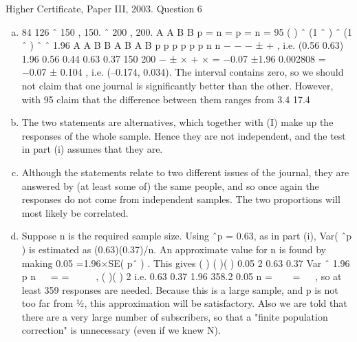 \documentclass[a4paper,12pt]{article}
\begin{document}
Higher Certificate, Paper III, 2003. Question 6
\begin{enumerate}[(a)]
\item  84 126
ˆ 150 , 150. ˆ 200 , 200. A A B B p = n = p = n =
95%
( ) ˆ (1 ˆ ) ˆ (1 ˆ )
ˆ ˆ 1.96 A A B B
A B
A B
p p p p
p p
n n
− −
− ± + ,
i.e. (0.56 0.63) 1.96 0.56 0.44 0.63 0.37
150 200
− ± × + ×
= −0.07 ±1.96 0.002808 = −0.07 ± 0.104 ,
i.e. (–0.174, 0.034).
The interval contains zero, so we should not claim that one journal is
significantly better than the other. However, with 95%
claim that the difference between them ranges from 3.4%
17.4%
\item The two statements are alternatives, which together with (I) make up the
responses of the whole sample. Hence they are not independent, and the test
in part (i) assumes that they are.
\item Although the statements relate to two different issues of the journal, they are
answered by (at least some of) the same people, and so once again the
responses do not come from independent samples. The two proportions will
most likely be correlated.
\item Suppose n is the required sample size. Using ˆp = 0.63, as in part (i), Var( ˆp )
is estimated as (0.63)(0.37)/n. An approximate value for n is found by making
0.05 =1.96×SE( pˆ ) . This gives
( ) ( )( ) 0.05 2 0.63 0.37 Var ˆ
1.96
p
n
  = =  
 
,
( )( )
2 i.e. 0.63 0.37 1.96 358.2
0.05
n =   =
 
,
so at least 359 responses are needed.
Because this is a large sample, and p is not too far from ½, this approximation
will be satisfactory. Also we are told that there are a very large number of
subscribers, so that a "finite population correction" is unnecessary (even if we
knew N).
\end{enumerate}
\end{document}
